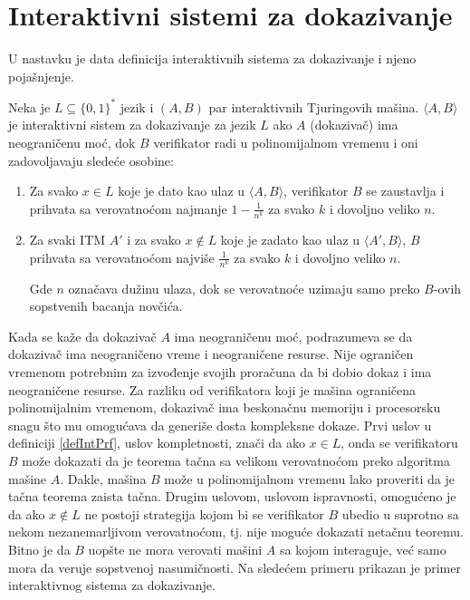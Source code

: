 \section{Interaktivni sistemi za dokazivanje}
U nastavku je data definicija interaktivnih sistema za dokazivanje i njeno pojašnjenje.
\begin{definition}
	Neka je $L\subseteq \{0,1\}^{*}$ jezik i $(A,B)$ par interaktivnih Tjuringovih mašina. $\langle A,B\rangle$ je interaktivni sistem za dokazivanje za jezik $L$ ako $A$ (dokazivač) ima neograničenu moć, dok $B$ verifikator radi u polinomijalnom vremenu i oni zadovoljavaju sledeće osobine:
	\begin{enumerate}
		\item Za svako $x \in L$ koje je dato kao ulaz u $\langle A,B\rangle$, verifikator $B$ se zaustavlja i prihvata sa verovatnoćom najmanje $1-\frac{1}{n^{k}}$ za svako $k$ i dovoljno veliko $n$.
		\item Za svaki \textenglish{ITM} $A'$ i za svako $x \notin L$ koje je zadato kao ulaz u $\langle A',B\rangle$, $B$ prihvata sa verovatnoćom najviše $\frac{1}{n^{k}}$ za svako $k$ i dovoljno veliko $n$.
		
		Gde $n$ označava dužinu ulaza, dok se verovatnoće uzimaju samo preko $B$-ovih sopstvenih bacanja novčića.
	\end{enumerate}
\label{defIntPrf}
\end{definition}

Kada se kaže da dokazivač $A$ ima neograničenu moć, podrazumeva se da dokazivač ima neograničeno vreme i neograničene resurse. Nije ograničen vremenom potrebnim za izvođenje svojih proračuna da bi dobio dokaz i ima neograničene resurse. Za razliku od verifikatora koji je mašina ograničena polinomijalnim vremenom, dokazivač ima beskonačnu memoriju i procesorsku snagu što mu omogućava da generiše dosta kompleksne dokaze.
Prvi uslov u definiciji \ref{defIntPrf}, uslov kompletnosti,  znači da ako $x \in L$, onda se verifikatoru $B$ može dokazati da je teorema tačna sa velikom verovatnoćom preko algoritma mašine $A$. Dakle, mašina $B$ može u polinomijalnom vremenu lako proveriti da je tačna teorema zaista tačna. Drugim uslovom, uslovom ispravnosti, omogućeno je da ako $x \notin L$ ne postoji strategija kojom bi se verifikator $B$ ubedio u suprotno sa nekom nezanemarljivom verovatnoćom, tj. nije moguće dokazati netačnu teoremu. Bitno je da $B$ uopšte ne mora verovati mašini $A$ sa kojom interaguje, već samo mora da veruje sopstvenoj nasumičnosti. Na sledećem primeru prikazan je primer interaktivnog sistema za dokazivanje.

